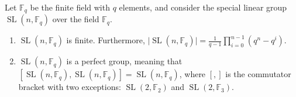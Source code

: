 \documentclass[12pt]{article}
\begin{document}
Let $\mathbb{F}_q$ be the finite field with $q$ elements, and consider the special linear group $\operatorname{SL}(n, \mathbb{F}_q)$ over the field $\mathbb{F}_q$.
\begin{enumerate}
\item $\operatorname{SL}(n, \mathbb F_q)$ is finite. Furthermore, $\lvert \operatorname{SL}(n, \mathbb{F}_q) \rvert = \frac{1}{q-1}\prod_{i=0}^{n-1}(q^n-q^i)$.
\item $\operatorname{SL}(n, \mathbb F_q)$ is a perfect group, meaning that $[\operatorname{SL}(n,\mathbb{F}_q),\operatorname{SL}(n,\mathbb{F}_q)] = \operatorname{SL}(n,\mathbb{F}_q)$, where $[,]$ is the commutator bracket with two  exceptions: $\operatorname{SL}(2,\mathbb{F}_2)$ and $\operatorname{SL}(2,\mathbb{F}_3)$.
\end{enumerate}
\end{document}
